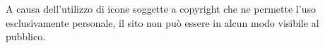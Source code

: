 A causa dell'utilizzo di icone soggette a copyright che ne permette l'uso esclusivamente personale, il sito non può essere in alcun modo
visibile al pubblico.
